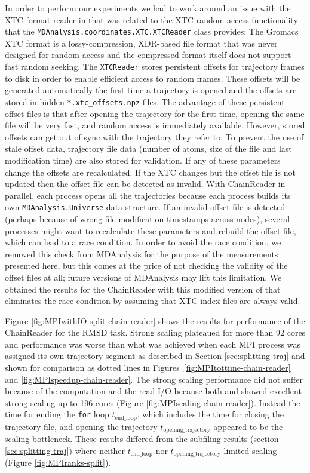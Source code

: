 In order to perform our experiments we had to work around an issue with the XTC format reader in  that was related to the XTC random-access functionality that the \texttt{MDAnalysis.coordinates.XTC.XTCReader} class provides:
The Gromacs XTC format \cite{Lindahl01, Spangberg:2011zr} is a lossy-compression, XDR-based file format that was never designed for random access and the compressed format itself does not support fast random seeking.
The \texttt{XTCReader} stores persistent offsets for trajectory frames to disk \cite{Gowers:2016aa} in order to enable efficient access to random frames.
These offsets will be generated automatically the first time a trajectory is opened and the offsets are stored in hidden \texttt{*.xtc\_offsets.npz} files. 
The advantage of these persistent offset files is that after opening the trajectory for the first time, opening the same file will be very fast, and random access is immediately available. 
However, stored offsets can get out of sync with the trajectory they refer to. 
To prevent the use of stale offset data, trajectory file data (number of atoms, size of the file and last modification time) are also stored for validation.
If any of these parameters change the offsets are recalculated. 
If the XTC changes but the offset file is not updated then the offset file can be detected as invalid.
With ChainReader in parallel, each process opens all the trajectories because each process builds its own \texttt{MDAnalysis.Universe} data structure.
If an invalid offset file is detected (perhaps because of wrong file modification timestamps across nodes), several processes might want to recalculate these parameters and rebuild the offset file, which can lead to a race condition.
In order to avoid the race condition, we removed this check from MDAnalysis for the purpose of the measurements presented here, but this comes at the price of not checking the validity of the offset files at all; future versions of MDAnalysis may lift this limitation.  
We obtained the results for the ChainReader with this modified version of  that eliminates the race condition by assuming that XTC index files are always valid.

Figure \ref{fig:MPIwithIO-split-chain-reader} shows the results for performance of the ChainReader for the RMSD task.
Strong scaling plateaued for more than 92 cores and performance was worse than what was achieved when each MPI process was assigned its own trajectory segment as described in Section \ref{sec:splitting-traj} and shown for comparison as dotted lines in Figures~\ref{fig:MPItottime-chain-reader} and \ref{fig:MPIspeedup-chain-reader}.
The strong scaling performance did not suffer because of the computation and the read I/O because both \tcomp and \tIO showed excellent strong scaling up to 196 cores (Figure \ref{fig:MPIscaling-chain-reader}).
Instead the time for ending the \texttt{for} loop $t_{\text{end\_loop}}$, which includes the time for closing the trajectory file, and opening the trajectory $t_{\text{opening\_trajectory}}$ appeared to be the scaling bottleneck.
These results differed from the subfiling results (section \ref{sec:splitting-traj}) where neither $t_{\text{end\_loop}}$ nor $t_{\text{opening\_trajectory}}$ limited scaling (Figure \ref{fig:MPIranks-split}). 

